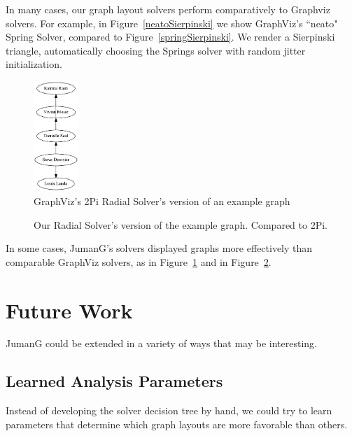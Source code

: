 \documentclass{article}
\begin{document}
In many cases, our graph layout solvers perform comparatively to Graphviz solvers. For example, in Figure~\ref{neatoSierpinski} we show GraphViz's ``neato" Spring Solver, compared to Figure~\ref{springSierpinski}. We render a Sierpinski triangle, automatically choosing the Springs solver with random jitter initialization.


\begin{figure}[h!]
\caption{GraphViz's 2Pi Radial Solver's version of an example graph}
\label{twopiTurnip}
\centering
\includegraphics[width=0.15\textwidth]{turnip_dag.png}
\end{figure}

\begin{figure}
\caption{Our Radial Solver's version of the example graph. Compared to 2Pi.}
\label{radialTurnip}
\end{figure}


In some cases, JumanG's solvers displayed graphs more effectively than comparable GraphViz solvers, as in Figure~\ref{twopiTurnip} and in Figure~\ref{radialTurnip}.




\section{Future Work}
JumanG could be extended in a variety of ways that may be interesting. 

\subsection{Learned Analysis Parameters}
Instead of developing the solver decision tree by hand, we could try to learn parameters that determine which graph layouts are more favorable than others. 
\end{document}
